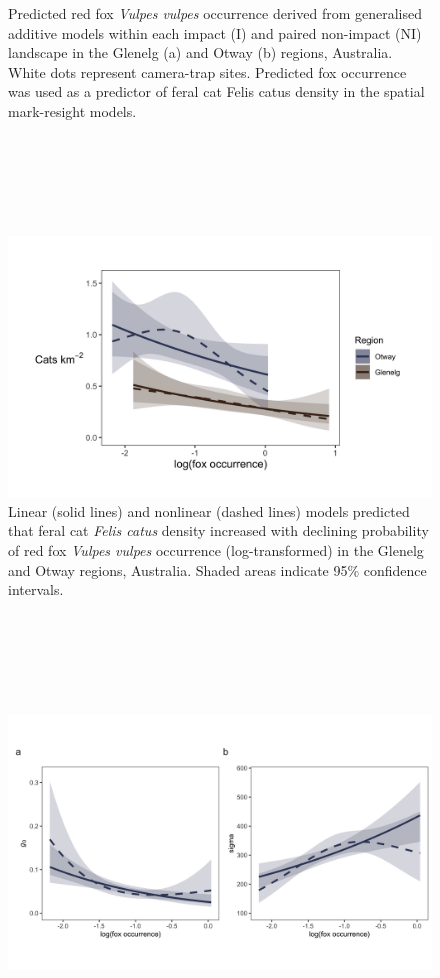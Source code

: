 \documentclass[11pt,a4paper,titlepage,twoside,openright]{style/unimelbthesis}
\begin{document}
\begin{mainmatter}
\begin{figure}
{}

\caption{Predicted red fox \textit{Vulpes vulpes} occurrence derived from generalised additive models within each impact (I) and paired non-impact (NI) landscape in the Glenelg (a) and Otway (b) regions, Australia. White dots represent camera-trap sites. Predicted fox occurrence was used as a predictor of feral cat Felis catus density in the spatial mark-resight models.}\label{fig:foxplot}
\end{figure}
\newpage

\(~\)

\(~\)

\(~\)
\begin{figure}

{\centering \includegraphics[width=1\linewidth]{figure/foxD_600dpi} 

}

\caption{Linear (solid lines) and nonlinear (dashed lines) models predicted that feral cat \textit{Felis catus} density increased with declining probability of red fox \textit{Vulpes vulpes} occurrence (log-transformed) in the Glenelg and Otway regions, Australia. Shaded areas indicate 95\% confidence intervals.}\label{fig:dcor}
\end{figure}
\newpage

\(~\)

\(~\)

\(~\)
\begin{figure}

{\centering \includegraphics[width=1\linewidth]{figure/foxDet_otways_600dpi} 

}
\end{figure}
\end{mainmatter}
\end{document}
